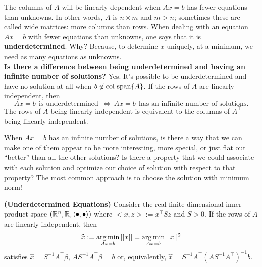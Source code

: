 \begin{tcolorbox}[title=\textbf{\Large Underdetermined Equations}]
The columns of $A$ will be linearly dependent when $Ax=b$ has fewer equations than unknowns. In other words, $A$ is $n \times m$ and $m > n$; sometimes these are called wide matrices: more columns than rows. When dealing with an equation $Ax=b$ with fewer equations than unknowns, one says that it is \textbf{underdetermined}. Why? Because, to determine $x$ uniquely, at a minimum, we need as many equations as unknowns.\\

\textbf{Is there a difference between being underdetermined and having an infinite number of solutions?} Yes. It's possible to be underdetermined and have no solution at all when $b \not \in \mathrm{col~span} \{ A \}$. If the rows of $A$ are linearly independent, then 
$$Ax=b ~~\text{is underdetermined}~~\iff ~Ax=b~~\text{has an infinite number of solutions.}$$
The rows of $A$ being linearly independent is equivalent to the columns of $A^\top$ being linearly independent.
\end{tcolorbox}
\vspace*{.2cm}
When $Ax=b$ has an infinite number of solutions, is there a way that we can make one of them appear to be more interesting, more special, or just flat out ``better'' than all the other solutions? Is there a property that we could associate with each solution and optimize our choice of solution with respect to that property? The most common approach is to choose the solution with minimum norm! \\

    
\begin{prop}
\label{prop:UnderDetermined}
\textbf{(Underdetermined Equations)} Consider the real finite dimensional inner product space $(\mathbb R^n, \mathbb R, \langle \bullet, \bullet \rangle)$ where {$<x,z>:= x^\top S z$}
    and $S > 0$. If the rows of $A$ are linearly independent, then
    $$\widehat{x}:= \operatorname*{arg\,min}_{Ax=b} ||x||=\operatorname*{arg\,min}_{Ax=b} ||x||^2$$
satisfies $ \widehat{x} = S^{-1} A^\top \beta$, $A S^{-1} A^\top \beta = b$ or, equivalently, $\widehat{x} = S^{-1} A^\top \left( A S^{-1} A^\top \right)^{-1}b$.
\end{prop}


